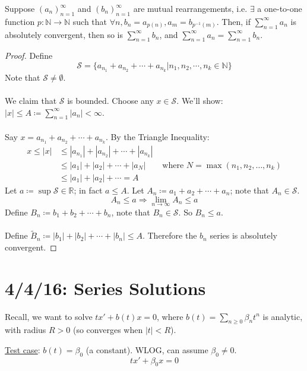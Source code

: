 \documentclass[12pt]{article}
\begin{document}
\begin{theorem}
Suppose $(a_n)_{n=1}^{\infty}$ and $(b_n)_{n=1}^{\infty}$ are mutual rearrangements, i.e. $\exists$ a one-to-one function $p: \mathbb{N} \to \mathbb{N}$ such that $\forall n, b_n = a_{p(n)}, a_m = b_{p^{-1}(m)}$. Then, if $\displaystyle\sum_{n=1}^{\infty}a_n$ is absolutely convergent, then so is $\displaystyle\sum_{n=1}^{\infty} b_n$, and $\displaystyle\sum_{n=1}^{\infty}a_n = \displaystyle\sum_{n=1}^{\infty}b_n$.
\end{theorem}

\begin{proof}
Define \[ \mathcal{S} = \{a_{n_1} + a_{n_2} + \cdots + a_{n_k} | n_1,n_2,\cdots,n_k \in \mathbb{N}\} \] Note that $\mathcal{S} \neq \emptyset$. \\ \\
We claim that $\mathcal{S}$ is bounded. Choose any $x \in \mathcal{S}$. We'll show: $|x| \le A \coloneqq \displaystyle\sum_{n=1}^{\infty}|a_n| < \infty$. \\ \\
Say $x = a_{n_1} + a_{n_2} + \cdots + a_{n_k}$. By the Triangle Inequality:
\[ 
\begin{aligned}
x \le |x| &\le |a_{n_1}| + |a_{n_2}| + \cdots + |a_{n_k}|  \\
&\le |a_1| + |a_2| + \cdots + |a_N| \qquad \text{where } N = \max(n_1,n_2,\dots,n_k)  \\
&\le |a_1| + |a_2| + \cdots = A
\end{aligned}
\]
Let $a \coloneqq \sup{\mathcal{S}} \in \mathbb{R}$; in fact $a \le A$. Let $A_n \coloneqq a_1 + a_2 + \cdots + a_n$; note that $A_n \in \mathcal{S}$. 
\[ A_n \le a \Rightarrow \lim_{n \to \infty} A_n \le a \]
Define $B_n \coloneqq b_1 + b_2 + \cdots + b_n$, note that $B_n \in \mathcal{S}$. So $B_n \le a$. \\ \\
Define $\tilde{B}_n \coloneqq |b_1| + |b_2| + \cdots + |b_n| \le A$.
Therefore the $b_n$ series is absolutely convergent.
\end{proof}

\section{4/4/16: Series Solutions}

Recall, we want to solve $tx' + b(t)x = 0$, where $b(t) = \displaystyle\sum_{n \ge 0}\beta_n t^n$ is analytic, with radius $R > 0$ (so converges when $|t| < R$).

\underline{Test case}: $b(t) = \beta_0$ (a constant). WLOG, can assume $\beta_0 \neq 0$.
\[ tx' + \beta_0x = 0 \]
\end{document}
